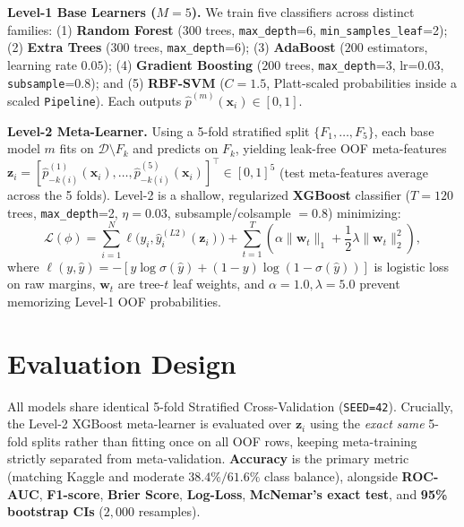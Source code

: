 \documentclass{article}
\begin{document}
\textbf{Level-1 Base Learners ($M=5$).} We train five classifiers across distinct families: (1) \textbf{Random Forest} ($300$ trees, \texttt{max\_depth}=6, \texttt{min\_samples\_leaf}=2); (2) \textbf{Extra Trees} \citep{geurts2006extremely} ($300$ trees, \texttt{max\_depth}=6); (3) \textbf{AdaBoost} \citep{freund1997decision} ($200$ estimators, learning rate $0.05$); (4) \textbf{Gradient Boosting} \citep{friedman2001gradient} ($200$ trees, \texttt{max\_depth}=3, lr=$0.03$, \texttt{subsample}=0.8); and (5) \textbf{RBF-SVM} \citep{cortes1995support} ($C=1.5$, Platt-scaled probabilities inside a scaled \texttt{Pipeline}). Each outputs $\hat{p}^{(m)}(\mathbf{x}_i) \in [0,1]$.

\textbf{Level-2 Meta-Learner.} Using a 5-fold stratified split $\{F_1,\dots,F_5\}$, each base model $m$ fits on $\mathcal{D}\setminus F_k$ and predicts on $F_k$, yielding leak-free OOF meta-features $\mathbf{z}_i = [\hat{p}^{(1)}_{-k(i)}(\mathbf{x}_i), \dots, \hat{p}^{(5)}_{-k(i)}(\mathbf{x}_i)]^\top \in [0,1]^5$ (test meta-features average across the 5 folds). Level-2 is a shallow, regularized \textbf{XGBoost} classifier \citep{chen2016xgboost} ($T=120$ trees, \texttt{max\_depth}=2, $\eta=0.03$, subsample/colsample $=0.8$) minimizing:
\begin{equation}
\mathcal{L}(\phi) = \sum_{i=1}^{N} \ell\big(y_i, \hat{y}_i^{(L2)}(\mathbf{z}_i)\big) + \sum_{t=1}^{T} \left( \alpha \|\mathbf{w}_t\|_1 + \frac{1}{2}\lambda \|\mathbf{w}_t\|_2^2 \right),
\end{equation}
where $\ell(y, \hat{y}) = -[y\log\sigma(\hat{y}) + (1-y)\log(1-\sigma(\hat{y}))]$ is logistic loss on raw margins, $\mathbf{w}_t$ are tree-$t$ leaf weights, and $\alpha=1.0, \lambda=5.0$ prevent memorizing Level-1 OOF probabilities.

\section{Evaluation Design}
All models share identical 5-fold Stratified Cross-Validation (\texttt{SEED=42}). Crucially, the Level-2 XGBoost meta-learner is evaluated over $\mathbf{z}_i$ using the \textit{exact same} 5-fold splits rather than fitting once on all OOF rows, keeping meta-training strictly separated from meta-validation. \textbf{Accuracy} is the primary metric (matching Kaggle and moderate $38.4\%/61.6\%$ class balance), alongside \textbf{ROC-AUC}, \textbf{F1-score}, \textbf{Brier Score}, \textbf{Log-Loss}, \textbf{McNemar's exact test}, and \textbf{95\% bootstrap CIs} ($2{,}000$ resamples).
\end{document}
